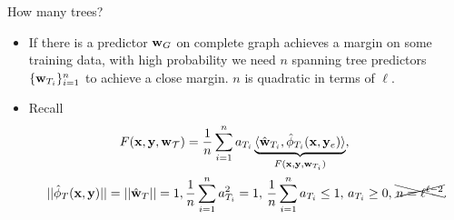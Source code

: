 \documentclass[first=dgreen,second=purple,logo=yellowexc]{aaltoslides}
\begin{document}
%
\begin{frame}{How many trees?}
	\begin{itemize}\footnotesize
		\item If there is a predictor $\mathbf {w}_G$ on complete graph achieves a margin on some training data, with high probability we need $n$ spanning tree predictors $\{\mathbf {w}_{T_i}\}_{i=1}^n$ to achieve a close margin. $n$ is quadratic in terms of $\ell$.
		\item Recall
		\begin{align*}\footnotesize
			F(\mathbf {x},\mathbf {y},\mathbf {w}_{\mathcal{T}}) &= \frac{1}{n}\sum_{i = 1}^{n}a_{T_i}\underbrace{\langle \hat{\mathbf {w}}_{T_i}, \hat{\phi}_{T_i}(\mathbf {x},\mathbf {y}_e) \rangle}_{F(\mathbf {x},\mathbf {y},\mathbf {w}_{T_i})},\\
			||\hat{\phi}_T(\mathbf {x},\mathbf {y})||=||\hat{\mathbf {w}}_{T}||=1,\, & \frac{1}{n}\sum_{i = 1}^{n}a_{T_i}^2=1, \, \frac{1}{n}\sum_{i = 1}^{n}a_{T_i}\le1,\, a_{T_i}\ge0,\, \xcancel{n=\ell^{\ell-2}}.
		\end{align*}
	\end{itemize}
\end{frame}
\end{document}
